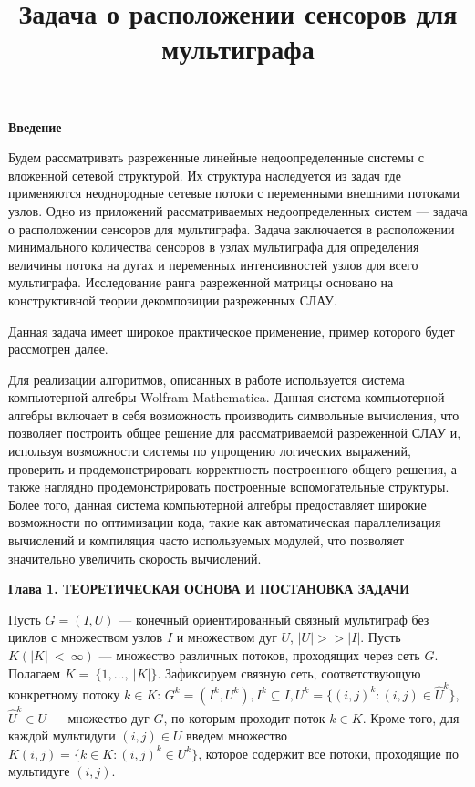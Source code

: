 \documentclass[14pt]{extarticle}%
\title{Задача о расположении сенсоров для мультиграфа}%
\date{}%
\begin{document}
%
\normalsize%
\vspace{-80pt}%
\begin{center}
    \textbf{Введение}
\end{center}

Будем рассматривать разреженные линейные недоопределенные системы с вложенной сетевой структурой. Их структура наследуется из задач где применяются неоднородные сетевые потоки с переменными внешними потоками узлов. Одно из приложений рассматриваемых недоопределенных систем --- задача о расположении сенсоров для мультиграфа. Задача заключается в расположении минимального количества сенсоров в узлах мультиграфа для определения величины потока на дугах и переменных интенсивностей узлов для всего мультиграфа. Исследование ранга разреженной матрицы основано на конструктивной теории декомпозиции разреженных СЛАУ.

Данная задача имеет широкое практическое применение, пример которого будет рассмотрен далее.

Для реализации алгоритмов, описанных в работе используется система компьютерной алгебры Wolfram Mathematica. Данная система компьютерной алгебры включает в себя возможность производить символьные вычисления, что позволяет построить общее решение для рассматриваемой разреженной СЛАУ и, используя возможности системы по упрощению логических выражений, проверить и продемонстрировать корректность построенного общего решения, а также наглядно продемонстрировать построенные вспомогательные структуры. Более того, данная система компьютерной алгебры предоставляет широкие возможности по оптимизации кода, такие как автоматическая параллелизация вычислений и компиляция часто используемых модулей, что позволяет значительно увеличить скорость вычислений.


\newpage
\begin{center}
    \textbf{Глава 1. ТЕОРЕТИЧЕСКАЯ ОСНОВА И ПОСТАНОВКА ЗАДАЧИ}
\end{center}

Пусть $G=(I,U)$ --- конечный ориентированный связный мультиграф без циклов с множеством узлов $I$ и множеством дуг $U$, $|U|>>|I|$. Пусть \\$K (|K|~<~\infty)$ --- множество различных потоков, проходящих через сеть $G$. Полагаем $K=~\{1,\dots,~|K|\}$. Зафиксируем связную сеть, соответствующую конкретному потоку $k\in K$: $G^k=(I^k, U^k), I^k\subseteq I,U^k=\{(i,j)^k:(i,j)\in \widehat{U}^k\}$,$\widehat{U}^k\in U$ --- множество дуг $G$, по которым проходит поток $k\in K$. Кроме того, для каждой мультидуги $(i,j)\in U$ введем множество $K(i,j)=\{k\in K:(i,j)^k\in U^k\}$, которое содержит все потоки, проходящие по мультидуге $(i,j)$.
\end{document}
